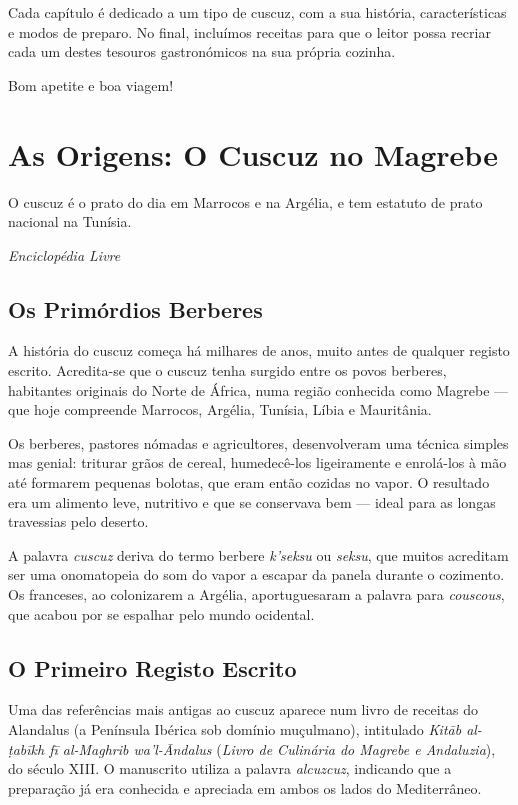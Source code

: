 \documentclass[12pt,a4paper,openright]{book}
\begin{document}
Cada capítulo é dedicado a um tipo de cuscuz, com a sua história, características e modos de preparo. No final, incluímos receitas para que o leitor possa recriar cada um destes tesouros gastronómicos na sua própria cozinha.

Bom apetite e boa viagem!

\chapter{As Origens: O Cuscuz no Magrebe}

\epigraph{O cuscuz é o prato do dia em Marrocos e na Argélia, e tem estatuto de prato nacional na Tunísia.}{\textit{Enciclopédia Livre}}

\section{Os Primórdios Berberes}

A história do cuscuz começa há milhares de anos, muito antes de qualquer registo escrito. Acredita-se que o cuscuz tenha surgido entre os povos berberes, habitantes originais do Norte de África, numa região conhecida como Magrebe --- que hoje compreende Marrocos, Argélia, Tunísia, Líbia e Mauritânia.

Os berberes, pastores nómadas e agricultores, desenvolveram uma técnica simples mas genial: triturar grãos de cereal, humedecê-los ligeiramente e enrolá-los à mão até formarem pequenas bolotas, que eram então cozidas no vapor. O resultado era um alimento leve, nutritivo e que se conservava bem --- ideal para as longas travessias pelo deserto.

A palavra \textit{cuscuz} deriva do termo berbere \textit{k'seksu} ou \textit{seksu}, que muitos acreditam ser uma onomatopeia do som do vapor a escapar da panela durante o cozimento. Os franceses, ao colonizarem a Argélia, aportuguesaram a palavra para \textit{couscous}, que acabou por se espalhar pelo mundo ocidental.

\section{O Primeiro Registo Escrito}

Uma das referências mais antigas ao cuscuz aparece num livro de receitas do Alandalus (a Península Ibérica sob domínio muçulmano), intitulado \textit{Kitāb al-ṭabīkh fī al-Maghrib wa'l-Āndalus} (\textit{Livro de Culinária do Magrebe e Andaluzia}), do século XIII. O manuscrito utiliza a palavra \textit{alcuzcuz}, indicando que a preparação já era conhecida e apreciada em ambos os lados do Mediterrâneo.
\end{document}
